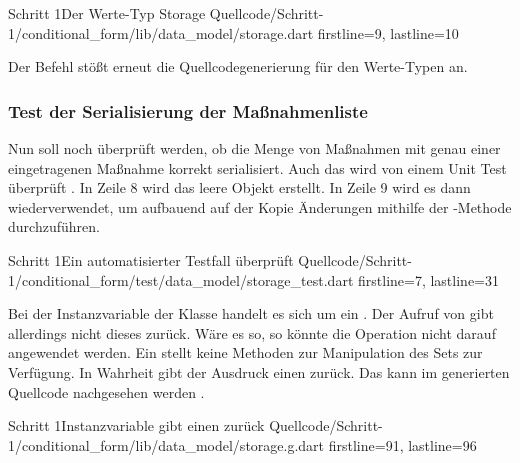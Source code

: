 \begin{alexlisting}{Schritt 1}{Der Werte-Typ Storage}
  {Quellcode/Schritt-1/conditional_form/lib/data_model/storage.dart}
  {firstline=9, lastline=10}
  \label{lst:Schritt1WerteTypStorage}
\end{alexlisting}

Der Befehl   stößt erneut die Quellcodegenerierung für den Werte-Typen  an. 

\subsubsection{Test der Serialisierung der Maßnahmenliste}

Nun soll noch überprüft werden, ob die Menge von Maßnahmen mit genau einer eingetragenen Maßnahme korrekt serialisiert. Auch das wird von einem Unit Test überprüft \Lst{\ref{lst:Schritt1MaßnahmenSerialisierenOhneFehlerUnitTest}}. In Zeile 8 wird das leere Objekt  erstellt. In Zeile 9 wird es dann wiederverwendet, um aufbauend auf der Kopie Änderungen mithilfe der -Methode durchzuführen.

\begin{alexlisting}{Schritt 1}{Ein automatisierter Testfall überprüft}
  {Quellcode/Schritt-1/conditional_form/test/data_model/storage_test.dart}
  {firstline=7, lastline=31}
  \label{lst:Schritt1MaßnahmenSerialisierenOhneFehlerUnitTest}
\end{alexlisting}

Bei der Instanzvariable  der Klasse  handelt es sich um ein .  Der Aufruf von   gibt allerdings nicht dieses  zurück. Wäre es so, so könnte die Operation  nicht  darauf angewendet werden. Ein  stellt keine Methoden zur Manipulation des Sets zur Verfügung. In Wahrheit gibt der Ausdruck  einen  zurück. Das kann im generierten Quellcode nachgesehen werden \LstZ{\ref{lst:Schritt1InstanzvariableMassnahmenGibtEinenSetBuilderZurueck}}. 

\begin{alexlisting}{Schritt 1}{Instanzvariable  gibt einen  zurück}
  {Quellcode/Schritt-1/conditional_form/lib/data_model/storage.g.dart}
  {firstline=91, lastline=96} 
  \label{lst:Schritt1InstanzvariableMassnahmenGibtEinenSetBuilderZurueck}
\end{alexlisting}

